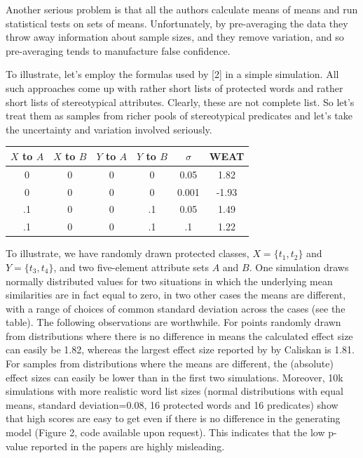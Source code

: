 \documentclass[
  12pt,
  dvipsnames,enabledeprecatedfontcommands]{scrartcl}
\begin{document}
Another serious problem is that all the authors calculate means of means
and run statistical tests on sets of means. Unfortunately, by
pre-averaging the data they throw away information about sample sizes,
and they remove variation, and so pre-averaging tends to manufacture
false confidence.

To illustrate, let's employ the formulas used by {[}2{]} in a simple
simulation. All such approaches come up with rather short lists of
protected words and rather short lists of stereotypical attributes.
Clearly, these are not complete list. So let's treat them as samples
from richer pools of stereotypical predicates and let's take the
uncertainty and variation involved seriously.

\begin{center}
\begin{tabular}{cccccc}\toprule
$X$ to $A$  & $X$ to $B$ & $Y$ to $A$ & $Y$ to $B$ & $\sigma$  & WEAT \\
\midrule
0 & 0 & 0 & 0 & 0.05 & 1.82 \\
0 & 0 & 0 & 0 & 0.001 & -1.93\\
.1 & 0 & 0 & .1 & 0.05 & 1.49 \\
.1 & 0 & 0 & .1 & .1 & 1.22\\
\bottomrule
\end{tabular}
\end{center}

To illustrate, we have randomly drawn protected classes,
\(X=\{t_1,t_2\}\) and \(Y=\{t_3,t_4\}\), and two five-element attribute
sets \(A\) and \(B\). One simulation draws normally distributed values
for two situations in which the underlying mean similarities are in fact
equal to zero, in two other cases the means are different, with a range
of choices of common standard deviation across the cases (see the
table). The following observations are worthwhile. For points randomly
drawn from distributions where there is no difference in means the
calculated effect size can easily be 1.82, whereas the largest effect
size reported by by Caliskan is 1.81. For samples from distributions
where the means are different, the (absolute) effect sizes can easily be
lower than in the first two simulations. Moreover, 10k simulations with
more realistic word list sizes (normal distributions with equal means,
standard deviation=0.08, 16 protected words and 16 predicates) show that
high scores are easy to get even if there is no difference in the
generating model (Figure 2, code available upon request). This indicates
that the low p-value reported in the papers are highly misleading.
\end{document}
